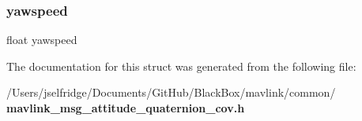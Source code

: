 \subsubsection{yawspeed}
{\footnotesize\ttfamily float yawspeed}



The documentation for this struct was generated from the following file\+:\begin{DoxyCompactItemize}
\item 
/\+Users/jselfridge/\+Documents/\+Git\+Hub/\+Black\+Box/mavlink/common/\textbf{ mavlink\+\_\+msg\+\_\+attitude\+\_\+quaternion\+\_\+cov.\+h}\end{DoxyCompactItemize}
